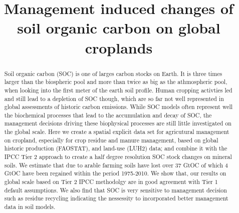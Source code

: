 \documentclass[gc, manuscript]{copernicus}
\begin{document}
\title{Management induced changes of soil organic carbon on global
croplands}











\received{}
\pubdiscuss{} %
\revised{}
\accepted{}
\published{}




\maketitle


\begin{abstract}
Soil organic carbon (SOC) is one of larges carbon stocks on Earth. It is
three times larger than the biospheric pool and more than twice as big
as the athmospheric pool, when looking into the first meter of the earth
soil profile. Human cropping activties led and still lead to a depletion
of SOC though, which are so far not well represented in global
assessments of historic carbon emissions. While SOC models often
represent well the biochemical processes that lead to the accumulation
and decay of SOC, the management decisions driving these biophysical
processes are still little investigated on the global scale. Here we
create a spatial explicit data set for agricutural management on
cropland, especially for crop residue and manure management, based on
global historic production (FAOSTAT), and land-use (LUH2) data; and
combine it with the IPCC Tier 2 approach to create a half degree
resolution SOC stock changes on mineral soils. We estimate that due to
arable farming soils have lost over 37 GtOC of which 4 GtOC have been
regained within the period 1975-2010. We show that, our results on
global scale based on Tier 2 IPCC methodolgy are in good agreement with
Tier 1 default assumptions. We also find that SOC is very sensitive to
management decision such as residue recycling indicating the nessessity
to incorporated better management data in soil models.
\end{abstract}
\end{document}

